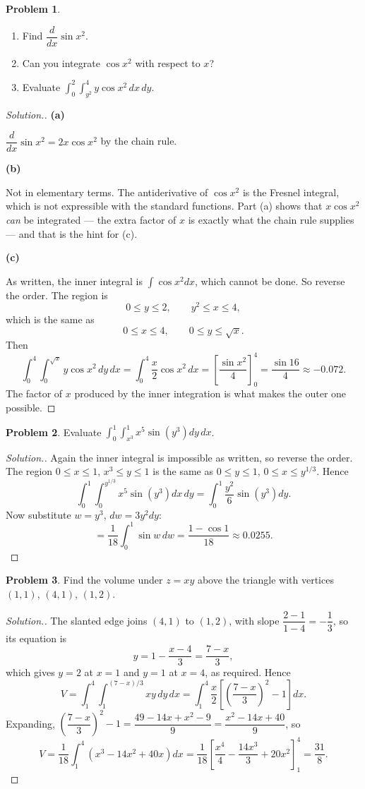 \documentclass[11pt,a4paper]{article}
\theoremstyle{definition}
\newtheorem{problemx}{Problem}[subsection]
\newenvironment{problem}{\begin{problemx}}{\end{problemx}}
\newenvironment{solution}
  {\renewcommand{\qedsymbol}{}\begin{proof}[\textit{Solution}.]}
  {\end{proof}}
\newcommand{\subhead}[1]{%
  \par\medskip\noindent\textbf{#1}\par\nobreak\smallskip}
\begin{document}
\begin{problem}
\begin{enumerate}
\item[(a)] Find $\dfrac{d}{dx}\sin x^2$.
\item[(b)] Can you integrate $\cos x^2$ with respect to $x$?
\item[(c)] Evaluate
$\displaystyle{\int_0^2\int_{y^2}^4 y\cos x^2\,dx\,dy}$.
\end{enumerate}
\end{problem}
\begin{solution}
\subhead{(a)}
$\dfrac{d}{dx}\sin x^2 = 2x\cos x^2$ by the chain rule.

\subhead{(b)}
Not in elementary terms. The antiderivative of $\cos x^2$ is the Fresnel
integral, which is not expressible with the standard functions. Part (a) shows
that $x\cos x^2$ \emph{can} be integrated --- the extra factor of $x$ is exactly
what the chain rule supplies --- and that is the hint for (c).

\subhead{(c)}
As written, the inner integral is $\int\cos x^2dx$, which cannot be done. So
reverse the order. The region is
\[0\leq y\leq 2,\qquad y^2\leq x\leq 4 ,\]
which is the same as
\[0\leq x\leq 4,\qquad 0\leq y\leq\sqrt x .\]
Then
\[\int_0^4\int_0^{\sqrt x}y\cos x^2\,dy\,dx
= \int_0^4\frac{x}{2}\cos x^2\,dx
= \left[\frac{\sin x^2}{4}\right]_0^4 = \frac{\sin 16}{4}\approx -0.072 .\]
The factor of $x$ produced by the inner integration is what makes the outer one
possible.
\end{solution}

\begin{problem}
Evaluate
$\displaystyle{\int_0^1\int_{x^3}^1 x^5\sin(y^3)dy\,dx}$.
\end{problem}
\begin{solution}
Again the inner integral is impossible as written, so reverse the order. The
region $0\leq x\leq 1$, $x^3\leq y\leq 1$ is the same as
$0\leq y\leq 1$, $0\leq x\leq y^{1/3}$. Hence
\[\int_0^1\int_0^{y^{1/3}}x^5\sin(y^3)dx\,dy
= \int_0^1\frac{y^2}{6}\sin(y^3)dy .\]
Now substitute $w = y^3$, $dw = 3y^2dy$:
\[= \frac{1}{18}\int_0^1\sin w\,dw = \frac{1-\cos 1}{18}\approx 0.0255 .\]
\end{solution}

\begin{problem}
Find the volume under $z = xy$ above the triangle with vertices $(1,1)$,
$(4,1)$, $(1,2)$.
\end{problem}
\begin{solution}
The slanted edge joins $(4,1)$ to $(1,2)$, with slope
$\dfrac{2-1}{1-4} = -\dfrac13$, so its equation is
\[y = 1 - \frac{x-4}{3} = \frac{7-x}{3},\]
which gives $y=2$ at $x=1$ and $y=1$ at $x=4$, as required. Hence
\[V = \int_1^4\int_1^{(7-x)/3}xy\,dy\,dx
= \int_1^4\frac{x}{2}\left[\left(\frac{7-x}{3}\right)^2 - 1\right]dx .\]
Expanding, $\left(\dfrac{7-x}{3}\right)^2 - 1 = \dfrac{49-14x+x^2-9}{9}
= \dfrac{x^2-14x+40}{9}$, so
\[V = \frac{1}{18}\int_1^4(x^3-14x^2+40x)dx
= \frac{1}{18}\left[\frac{x^4}{4}-\frac{14x^3}{3}+20x^2\right]_1^4
= \frac{31}{8}.\]
\end{solution}
\end{document}
